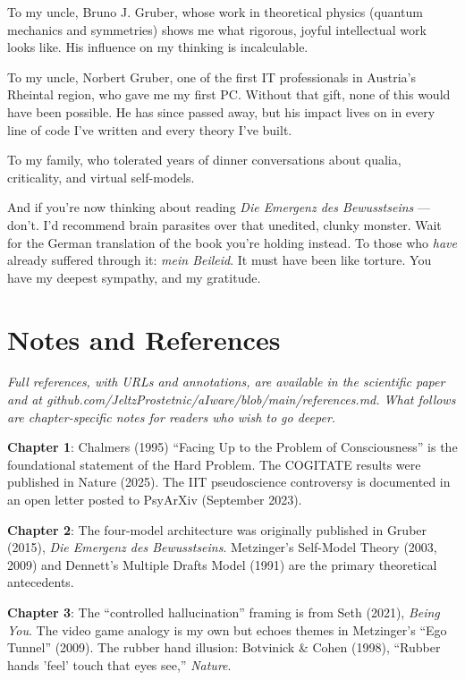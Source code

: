 \documentclass[11pt, twoside, openright]{book}
\begin{document}
To my uncle, Bruno J. Gruber, whose work in theoretical physics (quantum mechanics and symmetries) shows me what rigorous, joyful intellectual work looks like. His influence on my thinking is incalculable.

To my uncle, Norbert Gruber, one of the first IT professionals in Austria's Rheintal region, who gave me my first PC. Without that gift, none of this would have been possible. He has since passed away, but his impact lives on in every line of code I've written and every theory I've built.

To my family, who tolerated years of dinner conversations about qualia, criticality, and virtual self-models.

And if you're now thinking about reading \textit{Die Emergenz des Bewusstseins} --- don't. I'd recommend brain parasites over that unedited, clunky monster. Wait for the German translation of the book you're holding instead. To those who \textit{have} already suffered through it: \textit{mein Beileid}. It must have been like torture. You have my deepest sympathy, and my gratitude.


\chapter*{Notes and References}

\textit{Full references, with URLs and annotations, are available in the scientific paper and at github.com/JeltzProstetnic/aIware/blob/main/references.md. What follows are chapter-specific notes for readers who wish to go deeper.}

\textbf{Chapter 1}: Chalmers (1995) ``Facing Up to the Problem of Consciousness'' is the foundational statement of the Hard Problem. The COGITATE results were published in Nature (2025). The IIT pseudoscience controversy is documented in an open letter posted to PsyArXiv (September 2023).

\textbf{Chapter 2}: The four-model architecture was originally published in Gruber (2015), \textit{Die Emergenz des Bewusstseins}. Metzinger's Self-Model Theory (2003, 2009) and Dennett's Multiple Drafts Model (1991) are the primary theoretical antecedents.

\textbf{Chapter 3}: The ``controlled hallucination'' framing is from Seth (2021), \textit{Being You}. The video game analogy is my own but echoes themes in Metzinger's ``Ego Tunnel'' (2009). The rubber hand illusion: Botvinick \& Cohen (1998), ``Rubber hands 'feel' touch that eyes see,'' \textit{Nature}.
\end{document}
